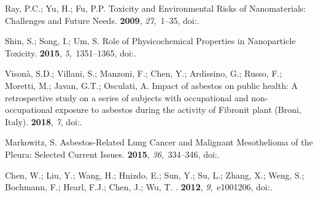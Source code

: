 \documentclass[ijms,article,accept,moreauthors,pdftex]{Definitions/mdpi}
\begin{document}
\begin{thebibliography}{999}

Ray, P.C.; Yu, H.; Fu, P.P.
\newblock Toxicity and Environmental Risks of Nanomaterials: Challenges and
  Future Needs.
 {\bf 2009},
  {\em 27},~1--35,
\newblock
  doi:{\href{https://doi.org/10.1080/10590500802708267}{}}.

Shin, S.; Song, I.; Um, S.
\newblock Role of Physicochemical Properties in Nanoparticle Toxicity.
 {\bf 2015}, {\em 5},~1351--1365,
\newblock
  doi:{\href{https://doi.org/10.3390/nano5031351}{}}.

Vison{\`{a}}, S.D.; Villani, S.; Manzoni, F.; Chen, Y.; Ardissino, G.; Russo,
  F.; Moretti, M.; Javan, G.T.; Osculati, A.
\newblock Impact of asbestos on public health: A retrospective study on a
  series of subjects with occupational and non-occupational exposure to
  asbestos during the activity of Fibronit plant (Broni, Italy).
 {\bf 2018}, \emph{7}, 
\newblock
  doi:{\href{https://doi.org/10.4081/jphr.2018.1519}{}}.

Markowitz, S.
\newblock Asbestos-Related Lung Cancer and Malignant Mesothelioma of the
  Pleura: Selected Current Issues.
 {\bf 2015},
  {\em 36},~334--346,
\newblock
  doi:{\href{https://doi.org/10.1055/s-0035-1549449}{}}.

Chen, W.; Liu, Y.; Wang, H.; Hnizdo, E.; Sun, Y.; Su, L.; Zhang, X.; Weng, S.;
  Bochmann, F.; Hearl, F.J.; Chen, J.; Wu, T.
.
 {\bf 2012}, {\em 9},~e1001206,
\newblock
  doi:{\href{https://doi.org/10.1371/journal.pmed.1001206}{}}.


\end{thebibliography}
\end{document}
